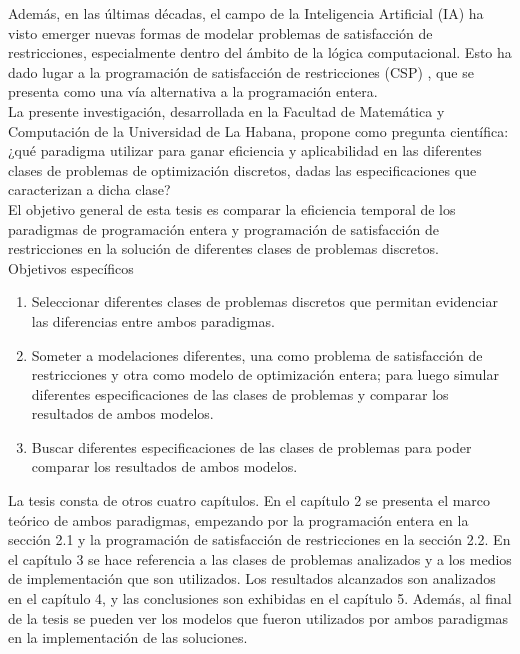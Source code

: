 \documentclass[12pt]{report}
\begin{document}
Además, en las últimas décadas, el campo de la Inteligencia Artificial (IA) ha visto emerger nuevas formas de modelar problemas de satisfacción de restricciones, especialmente dentro del ámbito de la lógica computacional. Esto ha dado lugar a la programación de satisfacción de restricciones (CSP) \cite{Rita}, que se presenta como una vía alternativa a la programación entera.  \\

La presente investigación, desarrollada en la Facultad de Matemática y Computación de la Universidad de La Habana, propone como pregunta científica: ¿qué paradigma utilizar para ganar eficiencia y aplicabilidad en las diferentes clases de problemas de optimización discretos, dadas las especificaciones que caracterizan a dicha clase?  \\

El objetivo general de esta tesis es comparar la eficiencia temporal de los paradigmas de programación entera y programación de satisfacción de restricciones en la solución de diferentes clases de problemas discretos. \\


Objetivos específicos
\begin{enumerate}
\item Seleccionar diferentes clases de problemas discretos que permitan evidenciar las diferencias entre ambos paradigmas.
\item Someter a modelaciones diferentes, una como problema de satisfacción de restricciones y otra como modelo de optimización entera; para luego simular diferentes especificaciones de las clases de problemas y comparar los resultados de ambos modelos.
\item Buscar diferentes especificaciones de las clases de problemas para poder comparar los resultados de ambos modelos.\\
\end{enumerate}

La tesis consta de otros cuatro capítulos. En el capítulo 2 se presenta el marco teórico de ambos paradigmas, empezando por la programación entera en la sección 2.1 y la programación de satisfacción de restricciones en la sección 2.2. En el capítulo 3 se hace referencia a las clases de problemas analizados y a los medios de implementación que son utilizados. Los resultados alcanzados son analizados en el capítulo 4, y las conclusiones son exhibidas en el capítulo 5. Además, al final de la tesis se pueden ver los modelos que fueron utilizados por ambos paradigmas en la implementación de las soluciones.\\
\end{document}
